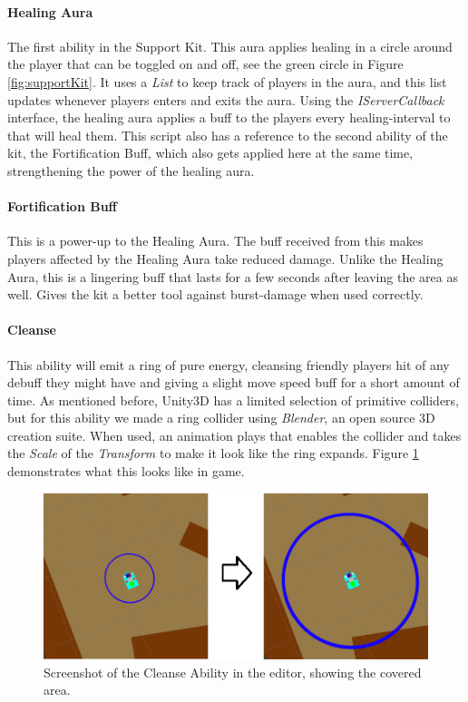 \paragraph{Healing Aura}
The first ability in the Support Kit. This aura applies healing in a circle around the player that can be toggled on and off, see the green circle in Figure \ref{fig:supportKit}. It uses a \emph{List} to keep track of players in the aura, and this list updates whenever players enters and exits the aura. Using the \emph{IServerCallback} interface, the healing aura applies a buff to the players every healing-interval to that will heal them. This script also has a reference to the second ability of the kit, the Fortification Buff, which also gets applied here at the same time, strengthening the power of the healing aura.

\paragraph{Fortification Buff}
This is a power-up to the Healing Aura. The buff received from this makes players affected by the Healing Aura take reduced damage. Unlike the Healing Aura, this is a lingering buff that lasts for a few seconds after leaving the area as well. Gives the kit a better tool against burst-damage when used correctly.

\paragraph{Cleanse}
This ability will emit a ring of pure energy, cleansing friendly players hit of any debuff they might have and giving a slight move speed buff for a short amount of time. As mentioned before, Unity3D has a limited selection of primitive colliders, but for this ability we made a ring collider using \emph{Blender}, an open source 3D creation suite. When used, an animation plays that enables the collider and  takes the \emph{Scale} of the \emph{Transform} to make it look like the ring expands. Figure \ref{fig:cleanseAbility} demonstrates what this looks like in game.

\begin{figure}[tbph]  %
  \centering
  \includegraphics[width=\textwidth]{images/CleanseAbility}
  \caption[Screenshot of the Cleanse Ability from the editor]{Screenshot of the Cleanse Ability in the editor, showing the covered area.}
  \label{fig:cleanseAbility}
\end{figure}


